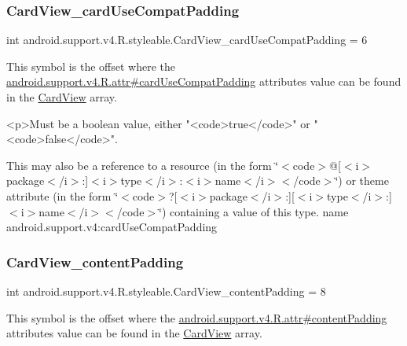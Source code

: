 \subsubsection{\texorpdfstring{Card\+View\+\_\+card\+Use\+Compat\+Padding}{CardView\_cardUseCompatPadding}}
{\footnotesize\ttfamily int android.\+support.\+v4.\+R.\+styleable.\+Card\+View\+\_\+card\+Use\+Compat\+Padding = 6\hspace{0.3cm}{\ttfamily [static]}}

This symbol is the offset where the \hyperlink{classandroid_1_1support_1_1v4_1_1R_1_1attr_a83aa94d57c705df5e9ea503e23367e56}{android.\+support.\+v4.\+R.\+attr\#card\+Use\+Compat\+Padding} attribute\textquotesingle{}s value can be found in the \hyperlink{classandroid_1_1support_1_1v4_1_1R_1_1styleable_a0e520cd4c78beb0d456e4018c4ba0e86}{Card\+View} array.

\begin{DoxyVerb}      <p>Must be a boolean value, either "<code>true</code>" or "<code>false</code>".
\end{DoxyVerb}
 

This may also be a reference to a resource (in the form \char`\"{}$<$code$>$@\mbox{[}$<$i$>$package$<$/i$>$\+:\mbox{]}$<$i$>$type$<$/i$>$\+:$<$i$>$name$<$/i$>$$<$/code$>$\char`\"{}) or theme attribute (in the form \char`\"{}$<$code$>$?\mbox{[}$<$i$>$package$<$/i$>$\+:\mbox{]}\mbox{[}$<$i$>$type$<$/i$>$\+:\mbox{]}$<$i$>$name$<$/i$>$$<$/code$>$\char`\"{}) containing a value of this type.  name android.\+support.\+v4\+:card\+Use\+Compat\+Padding \mbox{\label{classandroid_1_1support_1_1v4_1_1R_1_1styleable_a564488b553dfbc662144498fdb3ecd3f}} 
\subsubsection{\texorpdfstring{Card\+View\+\_\+content\+Padding}{CardView\_contentPadding}}
{\footnotesize\ttfamily int android.\+support.\+v4.\+R.\+styleable.\+Card\+View\+\_\+content\+Padding = 8\hspace{0.3cm}{\ttfamily [static]}}

This symbol is the offset where the \hyperlink{classandroid_1_1support_1_1v4_1_1R_1_1attr_a535fdec02c81c64089fb34983715bbd7}{android.\+support.\+v4.\+R.\+attr\#content\+Padding} attribute\textquotesingle{}s value can be found in the \hyperlink{classandroid_1_1support_1_1v4_1_1R_1_1styleable_a0e520cd4c78beb0d456e4018c4ba0e86}{Card\+View} array.

